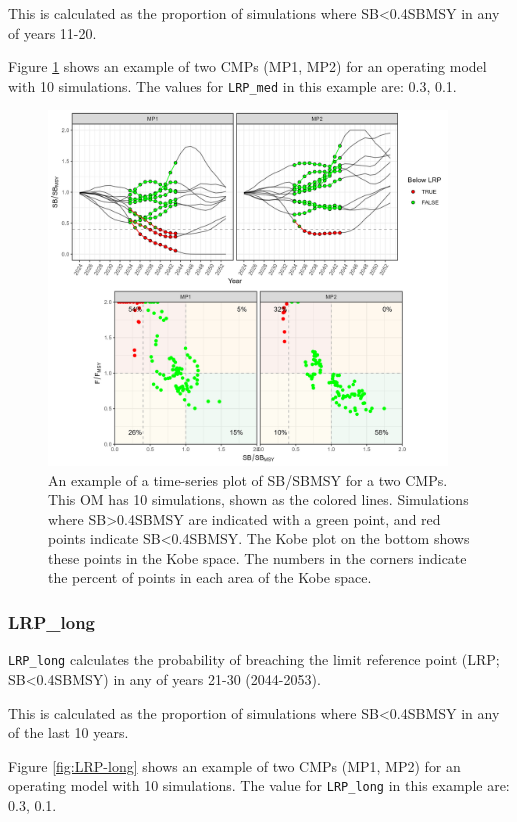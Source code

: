 \documentclass[
]{article}
\begin{document}
This is calculated as the proportion of simulations where SB\textless0.4SBMSY in any of years 11-20.

Figure \ref{fig:LRP-med} shows an example of two CMPs (MP1, MP2) for an operating model with 10 simulations. The values for \texttt{LRP\_med} in this example are: 0.3, 0.1.

\begin{figure}
\includegraphics[width=400px]{../../img/PMs/LRP_med} \caption{An example of a time-series plot of SB/SBMSY for a two CMPs. This OM has 10 simulations, shown as the colored lines. Simulations where SB>0.4SBMSY are indicated with a green point, and red points indicate SB<0.4SBMSY. The Kobe plot on the bottom shows these points in the Kobe space. The numbers in the corners indicate the percent of points in each area of the Kobe space.}\label{fig:LRP-med}
\end{figure}

\hypertarget{lrp_long}{%
\subsubsection{LRP\_long}\label{lrp_long}}

\texttt{LRP\_long} calculates the probability of breaching the limit reference point (LRP; SB\textless0.4SBMSY) in any of years 21-30 (2044-2053).

This is calculated as the proportion of simulations where SB\textless0.4SBMSY in any of the last 10 years.

Figure \ref{fig:LRP-long} shows an example of two CMPs (MP1, MP2) for an operating model with 10 simulations. The value for \texttt{LRP\_long} in this example are: 0.3, 0.1.
\end{document}

